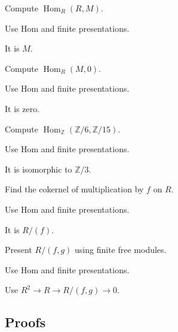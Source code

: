 \begin{exercise}\label{exr:v12-expand-01}
Compute $\operatorname{Hom}_R(R,M)$.
\end{exercise}
\begin{hint}
Use Hom and finite presentations.
\end{hint}
\begin{solution}
It is $M$.
\end{solution}

\begin{exercise}\label{exr:v12-expand-02}
Compute $\operatorname{Hom}_R(M,0)$.
\end{exercise}
\begin{hint}
Use Hom and finite presentations.
\end{hint}
\begin{solution}
It is zero.
\end{solution}

\begin{exercise}\label{exr:v12-expand-03}
Compute $\operatorname{Hom}_{\mathbb Z}(\mathbb Z/6,\mathbb Z/15)$.
\end{exercise}
\begin{hint}
Use Hom and finite presentations.
\end{hint}
\begin{solution}
It is isomorphic to $\mathbb Z/3$.
\end{solution}

\begin{exercise}[Cokernel]\label{exr:v12-expand-04}
Find the cokernel of multiplication by $f$ on $R$.
\end{exercise}
\begin{hint}
Use Hom and finite presentations.
\end{hint}
\begin{solution}
It is $R/(f)$.
\end{solution}

\begin{exercise}[Presentation]\label{exr:v12-expand-05}
Present $R/(f,g)$ using finite free modules.
\end{exercise}
\begin{hint}
Use Hom and finite presentations.
\end{hint}
\begin{solution}
Use $R^2\to R\to R/(f,g)\to0$.
\end{solution}

\subsection*{Proofs}

